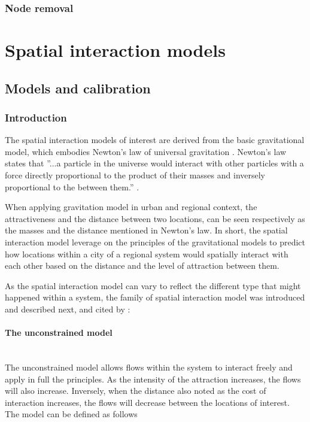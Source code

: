 \documentclass{article}
\begin{document}
\subsubsection{Node removal}

\section{Spatial interaction models}


\subsection{Models and calibration}

\subsubsection{Introduction}

The spatial interaction models of interest are derived from the basic gravitational model, which embodies Newton's law of universal gravitation \citep{battyUrbanModellingAlgorithms1976}. Newton's law states that ''...a particle in the universe would interact with other particles with a force directly proportional to the product of their masses and inversely proportional to the between them.'' \citep{battyUrbanSimulationSpatial2023}.

When applying gravitation model in urban and regional context, the attractiveness and the distance between two locations, can be seen respectively as the masses and the distance mentioned in Newton's law. In short, the spatial interaction model leverage on the principles of the gravitational models to predict how locations within a city of a regional system would spatially interact with each other based on the distance and the level of attraction between them.

As the spatial interaction model can vary to reflect the different type that might happened within a system, the family of spatial interaction model was introduced and described next, \citep{wilsonEntropyUrbanRegional2011} and \citep{wilsonFamilySpatialInteraction1971} cited by \citep{battyUrbanModellingAlgorithms1976}:

\paragraph{The unconstrained model}\mbox{}\\

The unconstrained model allows flows within the system to interact freely and apply in full the principles. As the intensity of the attraction increases, the flows will also increase. Inversely, when the distance also noted as the cost of interaction increases, the flows will decrease between the locations of interest. The model can be defined as follows \citep{arcauteSpatialInteractionModelling2023}
\end{document}
